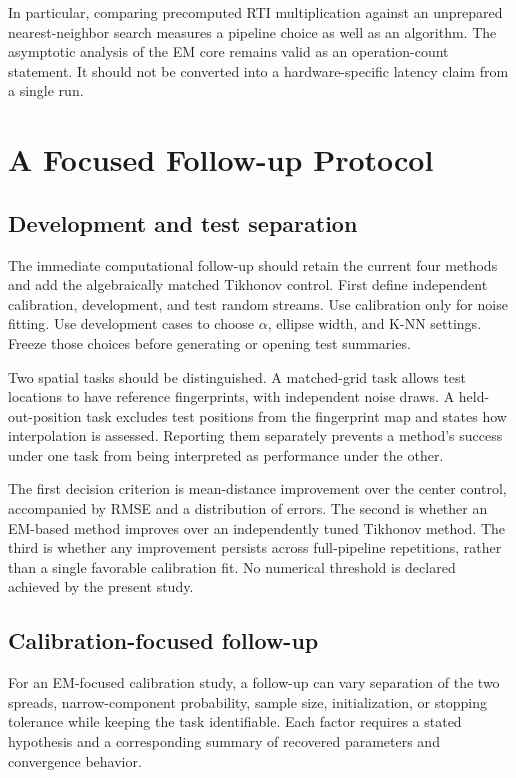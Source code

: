 \documentclass[conference,letterpaper]{IEEEtran}
\begin{document}
In particular, comparing precomputed RTI multiplication against an unprepared nearest-neighbor search measures a pipeline choice as well as an algorithm. The asymptotic analysis of the EM core remains valid as an operation-count statement. It should not be converted into a hardware-specific latency claim from a single run.

\section{A Focused Follow-up Protocol}
\subsection{Development and test separation}
The immediate computational follow-up should retain the current four methods and add the algebraically matched Tikhonov control. First define independent calibration, development, and test random streams. Use calibration only for noise fitting. Use development cases to choose $\alpha$, ellipse width, and K-NN settings. Freeze those choices before generating or opening test summaries.

Two spatial tasks should be distinguished. A matched-grid task allows test locations to have reference fingerprints, with independent noise draws. A held-out-position task excludes test positions from the fingerprint map and states how interpolation is assessed. Reporting them separately prevents a method's success under one task from being interpreted as performance under the other.

The first decision criterion is mean-distance improvement over the center control, accompanied by RMSE and a distribution of errors. The second is whether an EM-based method improves over an independently tuned Tikhonov method. The third is whether any improvement persists across full-pipeline repetitions, rather than a single favorable calibration fit. No numerical threshold is declared achieved by the present study.

\subsection{Calibration-focused follow-up}
For an EM-focused calibration study, a follow-up can vary separation of the two spreads, narrow-component probability, sample size, initialization, or stopping tolerance while keeping the task identifiable. Each factor requires a stated hypothesis and a corresponding summary of recovered parameters and convergence behavior.
\end{document}
